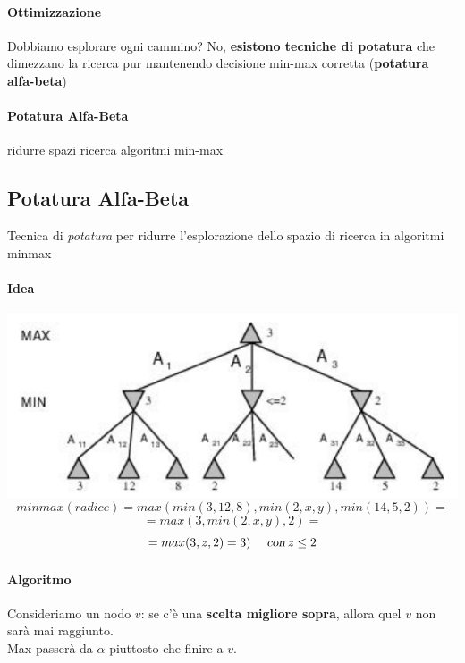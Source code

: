 \documentclass[10pt]{book}
\begin{document}
\paragraph{Ottimizzazione} Dobbiamo esplorare ogni cammino? No, \textbf{esistono tecniche di potatura} che dimezzano la ricerca pur mantenendo decisione min-max corretta (\textbf{potatura alfa-beta})
\paragraph{Potatura Alfa-Beta} ridurre spazi ricerca algoritmi min-max
\subsection{Potatura Alfa-Beta}
Tecnica di \textit{potatura} per ridurre l'esplorazione dello spazio di ricerca in algoritmi minmax
\paragraph{Idea}
\begin{center}
	\includegraphics[scale=0.7]{minmaxidea.png}
	$$minmax(radice) = max(min(3, 12, 8), min(2, x, y), min (14, 5, 2)) =$$ $$= max(3, min(2, x, y), 2) =$$ $$= max(3, z, 2) = 3)\:\:\:\:\:\:\textsl{con}\:z \leq 2$$
\end{center}
\paragraph{Algoritmo} Consideriamo un nodo $v$: se c'è una \textbf{scelta migliore sopra}, allora quel $v$ non sarà mai raggiunto.\\
Max passerà da $\alpha$ piuttosto che finire a $v$.
\end{document}
